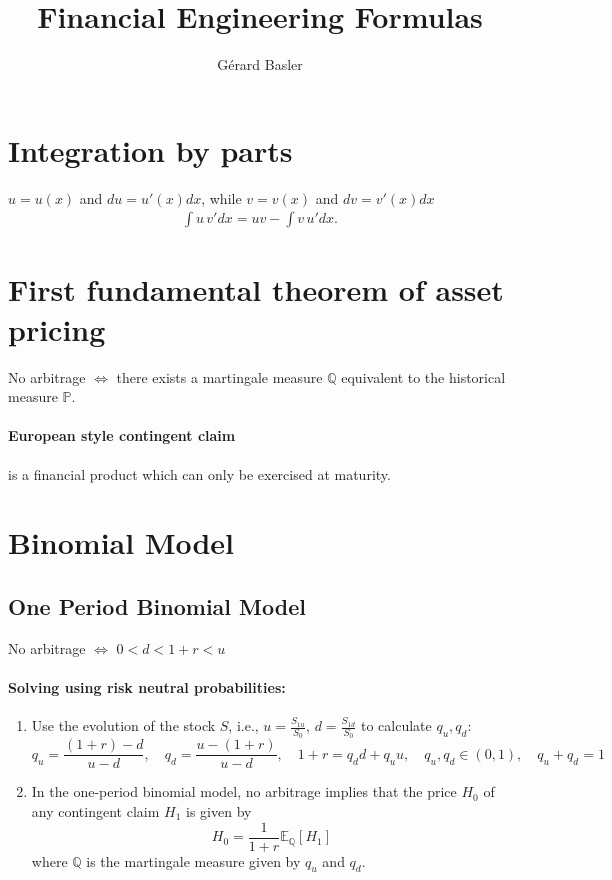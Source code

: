 \documentclass[a4paper, DIV19,12pt]{scrartcl}
\title{Financial Engineering Formulas}
\author{G\'{e}rard Basler}
\date{} %
\newcommand{\bparens}  [1]{\left(       #1 \right)      } %
\newcommand{\bbrackets}[1]{\left   [    #1 \right   ]   } %
\begin{document}
\maketitle

\section{Integration by parts}

$u = u(x)$ and $du = u'(x) dx$, while $v = v(x)$ and $dv = v'(x) dx$
\begin{eqnarray}
\int u \, v'  dx = uv-\int v \, u' dx.\! 
\end{eqnarray}

\section{First fundamental theorem of asset pricing}

No arbitrage $\Leftrightarrow$ there exists a martingale measure $\mathbb{Q}$ equivalent to the historical measure $\mathbb{P}$.

\paragraph{European style contingent claim} is a financial product which can only be exercised at maturity.

\section{Binomial Model}

\subsection{One Period Binomial Model}

No arbitrage $\Leftrightarrow$ $0 < d < 1 + r < u$

\paragraph{Solving using risk neutral probabilities:}

\begin{enumerate}
\item Use the evolution of the stock $S$, i.e., $u = \frac{S_{1u}}{S_0}$, $d = \frac{S_{1d}}{S_0}$ to calculate $q_u, q_d$: 
\begin{equation}
q_u = \frac{\bparens{1+r} - d}{u - d}, \quad q_d = \frac{u - \bparens{1+r}}{u - d} 
,\quad 1 + r = q_d d + q_u u, \quad q_u, q_d \in \bparens{0, 1}, \quad q_u + q_d = 1
\end{equation}
\item
In the one-period binomial model, no arbitrage implies that the price $H_0$ of any contingent claim $H_1$ is given by 
\begin{equation}
H_0 = \frac{1}{1 + r} \mathbb{E_Q}\bbrackets{H_1}
\end{equation}
where $\mathbb{Q}$ is the martingale measure given by $q_u$ and $q_d$.

\end{enumerate}
\end{document}
